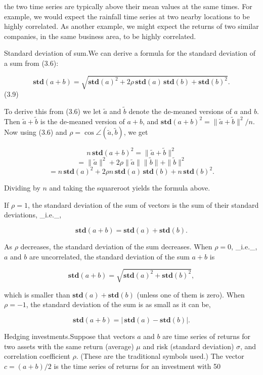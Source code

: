 the two time series are typically above their mean values at the same times. For example, we would expect the rainfall time series at two nearby locations to be highly correlated. As another example, we might expect the returns of two similar companies, in the same business area, to be highly correlated.

Standard deviation of sum.We can derive a formula for the standard deviation of a sum from (3.6):

\[\mathbf{std}(a+b)=\sqrt{\mathbf{std}(a)^{2}+2\rho\,\mathbf{std}(a)\,\mathbf{std }(b)+\mathbf{std}(b)^{2}}.\] (3.9)

To derive this from (3.6) we let \(\tilde{a}\) and \(\tilde{b}\) denote the de-meaned versions of \(a\) and \(b\). Then \(\tilde{a}+\tilde{b}\) is the de-meaned version of \(a+b\), and \(\mathbf{std}(a+b)^{2}=\|\tilde{a}+\tilde{b}\|^{2}/n\). Now using (3.6) and \(\rho=\cos\angle(\tilde{a},\tilde{b})\), we get

\[n\,\mathbf{std}(a+b)^{2} = \|\tilde{a}+\tilde{b}\|^{2}\] \[= \|\tilde{a}\|^{2}+2\rho\|\tilde{a}\|\|\tilde{b}\|+\|\tilde{b}\|^ {2}\] \[= n\,\mathbf{std}(a)^{2}+2\rho n\,\mathbf{std}(a)\,\mathbf{std}(b )+n\,\mathbf{std}(b)^{2}.\]

Dividing by \(n\) and taking the squareroot yields the formula above.

If \(\rho=1\), the standard deviation of the sum of vectors is the sum of their standard deviations, _i.e._,

\[\mathbf{std}(a+b)=\mathbf{std}(a)+\mathbf{std}(b).\]

As \(\rho\) decreases, the standard deviation of the sum decreases. When \(\rho=0\), _i.e._, \(a\) and \(b\) are uncorrelated, the standard deviation of the sum \(a+b\) is

\[\mathbf{std}(a+b)=\sqrt{\mathbf{std}(a)^{2}+\mathbf{std}(b)^{2}},\]

which is smaller than \(\mathbf{std}(a)+\mathbf{std}(b)\) (unless one of them is zero). When \(\rho=-1\), the standard deviation of the sum is as small as it can be,

\[\mathbf{std}(a+b)=|\,\mathbf{std}(a)-\mathbf{std}(b)|.\]

Hedging investments.Suppose that vectors \(a\) and \(b\) are time series of returns for two assets with the same return (average) \(\mu\) and risk (standard deviation) \(\sigma\), and correlation coefficient \(\rho\). (These are the traditional symbols used.) The vector \(c=(a+b)/2\) is the time series of returns for an investment with 50%


